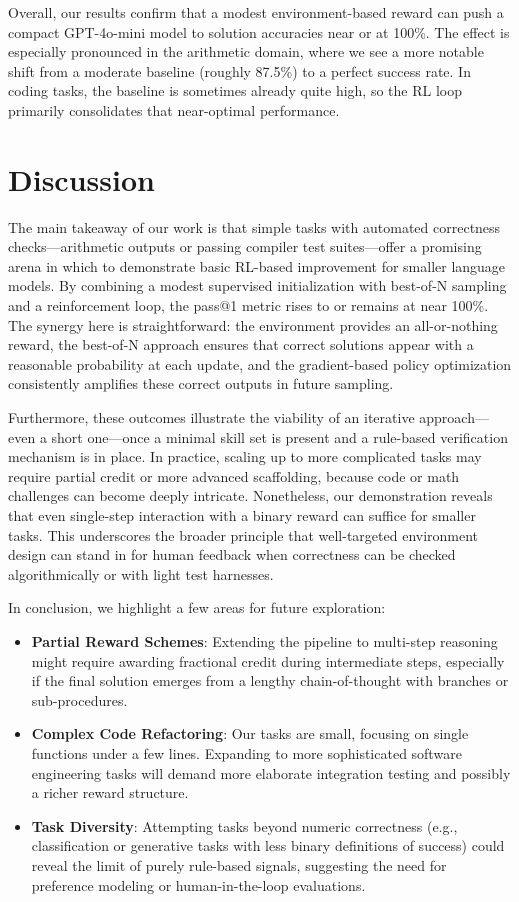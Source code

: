 \documentclass{article}
\begin{document}
Overall, our results confirm that a modest environment-based reward can push a compact GPT-4o-mini model to solution accuracies near or at 100\%. The effect is especially pronounced in the arithmetic domain, where we see a more notable shift from a moderate baseline (roughly 87.5\%) to a perfect success rate. In coding tasks, the baseline is sometimes already quite high, so the RL loop primarily consolidates that near-optimal performance.

\section{Discussion}
The main takeaway of our work is that simple tasks with automated correctness checks—arithmetic outputs or passing compiler test suites—offer a promising arena in which to demonstrate basic RL-based improvement for smaller language models. By combining a modest supervised initialization with best-of-N sampling and a reinforcement loop, the pass@1 metric rises to or remains at near 100\%. The synergy here is straightforward: the environment provides an all-or-nothing reward, the best-of-N approach ensures that correct solutions appear with a reasonable probability at each update, and the gradient-based policy optimization consistently amplifies these correct outputs in future sampling.

Furthermore, these outcomes illustrate the viability of an iterative approach—even a short one—once a minimal skill set is present and a rule-based verification mechanism is in place. In practice, scaling up to more complicated tasks may require partial credit or more advanced scaffolding, because code or math challenges can become deeply intricate. Nonetheless, our demonstration reveals that even single-step interaction with a binary reward can suffice for smaller tasks. This underscores the broader principle that well-targeted environment design can stand in for human feedback when correctness can be checked algorithmically or with light test harnesses.

In conclusion, we highlight a few areas for future exploration:
\begin{itemize}
\item \textbf{Partial Reward Schemes}: Extending the pipeline to multi-step reasoning might require awarding fractional credit during intermediate steps, especially if the final solution emerges from a lengthy chain-of-thought with branches or sub-procedures.
\item \textbf{Complex Code Refactoring}: Our tasks are small, focusing on single functions under a few lines. Expanding to more sophisticated software engineering tasks will demand more elaborate integration testing and possibly a richer reward structure.
\item \textbf{Task Diversity}: Attempting tasks beyond numeric correctness (e.g., classification or generative tasks with less binary definitions of success) could reveal the limit of purely rule-based signals, suggesting the need for preference modeling or human-in-the-loop evaluations.
\end{itemize}
\end{document}
